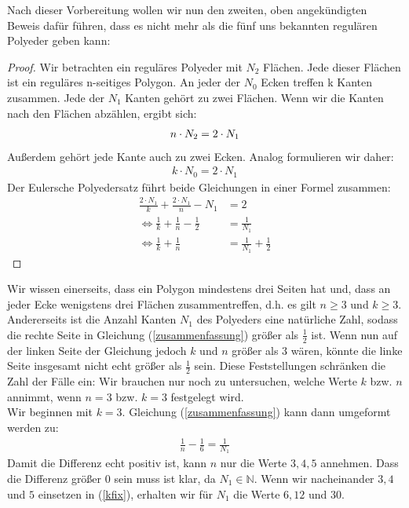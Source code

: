 Nach dieser Vorbereitung wollen wir nun den zweiten, oben angekündigten Beweis dafür führen, dass es nicht mehr als die fünf uns bekannten regulären Polyeder geben kann:
\begin{proof}
Wir betrachten ein reguläres Polyeder mit $N_2$ Flächen. Jede dieser Flächen ist ein reguläres n-seitiges Polygon.
An jeder der $N_0$ Ecken treffen k Kanten zusammen.
Jede der $N_1$ Kanten gehört zu zwei Flächen. Wenn wir die Kanten nach den Flächen abzählen, ergibt sich:
\begin{align}
\setcounter{equation}{0}
n\cdot N_2= 2\cdot N_1 \label{start1}
\end{align}
Außerdem gehört jede Kante auch zu zwei Ecken. Analog formulieren wir daher:
\begin{align}
k\cdot N_0=2 \cdot N_1 \label{start2}
\end{align}
Der Eulersche Polyedersatz führt beide Gleichungen in einer Formel zusammen:
\begin{align}
\frac{2\cdot N_1}{k} + \frac{2\cdot N_1}{n} - N_1 &= 2 \\
\Leftrightarrow \frac{1}{k} + \frac{1}{n} - \frac{1}{2} &= \frac{1}{N_1}\\
\Leftrightarrow \frac{1}{k} + \frac{1}{n}  &= \frac{1}{N_1} + \frac{1}{2}\label{zusammenfassung}
\end{align}
\end{proof}
Wir wissen einerseits, dass ein Polygon mindestens drei Seiten hat und, dass an jeder Ecke wenigstens drei Flächen zusammentreffen, d.h. es gilt $n\geq 3$ und $k\geq 3$. Andererseits ist die Anzahl Kanten $N_1$ des Polyeders eine natürliche Zahl, sodass die rechte Seite in Gleichung (\ref{zusammenfassung}) größer als $\frac{1}{2}$ ist. Wenn nun auf der linken Seite der Gleichung jedoch $k$ und $n$ größer als 3 wären, könnte die linke Seite insgesamt nicht echt größer als $\frac{1}{2}$  sein. Diese Feststellungen schränken die Zahl der Fälle ein: Wir brauchen nur noch zu untersuchen, welche Werte $k$ bzw. $n$ annimmt, wenn $n=3$ bzw. $k=3$ festgelegt wird.\\
Wir beginnen mit $k=3$.
Gleichung (\ref{zusammenfassung}) kann dann umgeformt werden zu:
\begin{align}
\frac{1}{n}- \frac{1}{6}= \frac{1}{N_1} \label{kfix}
\end{align}
Damit die Differenz echt positiv ist, kann $n$ nur die Werte $3, 4, 5$ annehmen. Dass die Differenz größer 0 sein muss ist klar, da $N_1 \in \mathbb{N}$.
Wenn wir nacheinander $3,4$ und $5$ einsetzen in (\ref{kfix}), erhalten wir für $N_1$ die Werte $6, 12$ und $30$.\\
